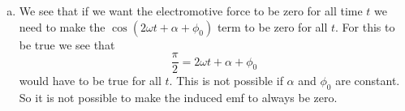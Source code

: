 \documentclass[11pt]{article}
\numberwithin{equation}{section}
\begin{document}
\begin{enumerate}[(a)]
\item
We see that if we want the electromotive force to be zero for all time $t$ we need to make the $\cos(2\omega t+\alpha+\phi_0)$ term to be zero for all $t$. For this to be true we see that
$$\frac{\pi}{2} = 2\omega t+\alpha+\phi_0$$
would have to be true for all $t$. This is not possible if $\alpha$ and $\phi_0$ are constant. So it is not possible to make the induced emf to always be zero.
\end{enumerate}
\end{document}
